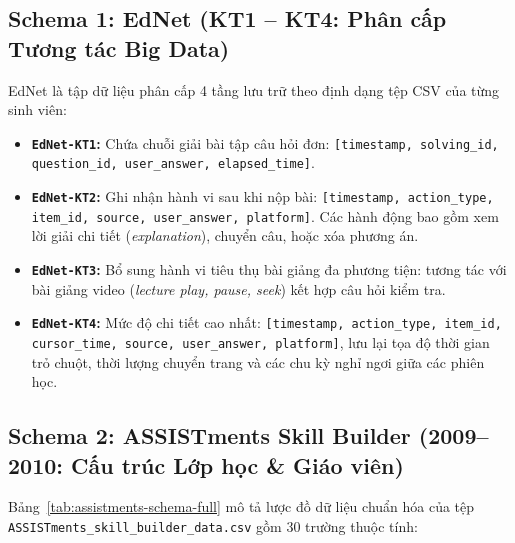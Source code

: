 \subsection{Schema 1: EdNet (KT1 -- KT4: Phân cấp Tương tác Big Data)}\label{subsec:schema-ednet}
EdNet là tập dữ liệu phân cấp 4 tầng lưu trữ theo định dạng tệp CSV của từng sinh viên:
\begin{itemize}
  \item \textbf{\texttt{EdNet-KT1}:} Chứa chuỗi giải bài tập câu hỏi đơn: \texttt{[timestamp, solving\_id, question\_id, user\_answer, elapsed\_time]}.
  \item \textbf{\texttt{EdNet-KT2}:} Ghi nhận hành vi sau khi nộp bài: \texttt{[timestamp, action\_type, item\_id, source, user\_answer, platform]}. Các hành động bao gồm xem lời giải chi tiết (\textit{explanation}), chuyển câu, hoặc xóa phương án.
  \item \textbf{\texttt{EdNet-KT3}:} Bổ sung hành vi tiêu thụ bài giảng đa phương tiện: tương tác với bài giảng video (\textit{lecture play, pause, seek}) kết hợp câu hỏi kiểm tra.
  \item \textbf{\texttt{EdNet-KT4}:} Mức độ chi tiết cao nhất: \texttt{[timestamp, action\_type, item\_id, cursor\_time, source, user\_answer, platform]}, lưu lại tọa độ thời gian trỏ chuột, thời lượng chuyển trang và các chu kỳ nghỉ ngơi giữa các phiên học.
\end{itemize}

\subsection{Schema 2: ASSISTments Skill Builder (2009--2010: Cấu trúc Lớp học \& Giáo viên)}\label{subsec:schema-assistments}
Bảng~\ref{tab:assistments-schema-full} mô tả lược đồ dữ liệu chuẩn hóa của tệp \texttt{ASSISTments\_skill\_builder\_data.csv} gồm 30 trường thuộc tính:

